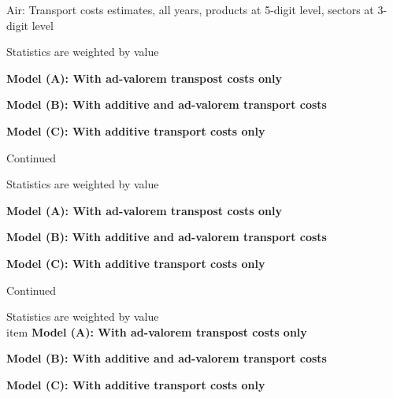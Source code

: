 \documentclass[11pt,twoside, authoryear]{elsarticle}
\begin{document}
\begin{landscape}
\begin{table}[htbp]
	
	\caption{Air: Transport costs estimates, all years, products at 5-digit level, sectors at 3-digit level}
	\begin{center}
		
		
				\begin{tablenotes}
			\tiny
			\item Statistics are weighted by value
			\item \textbf{Model (A): With ad-valorem transpost costs only}
			\item \textbf{Model (B): With additive and ad-valorem transport costs}
			\item \textbf{Model (C): With additive transport costs only}
		\end{tablenotes}
		
	\end{center}
	\label{tab_oa:result_ves_ally3}%
\end{table}%


\begin{table}[htbp]
	
	\caption{Continued}
	\begin{center}
		
		
				\begin{tablenotes}
			\tiny
			\item Statistics are weighted by value
			\item \textbf{Model (A): With ad-valorem transpost costs only}
			\item \textbf{Model (B): With additive and ad-valorem transport costs}
			\item \textbf{Model (C): With additive transport costs only}
		\end{tablenotes}
		
	\end{center}
	\label{tab_oa:result_ves_ally3}%
\end{table}%

\begin{table}[htbp]

\caption{Continued}
\begin{center}
	
	
			\begin{tablenotes}
		\tiny
		\item Statistics are weighted by value
		\\item \textbf{Model (A): With ad-valorem transpost costs only}
		\item \textbf{Model (B): With additive and ad-valorem transport costs}
		\item \textbf{Model (C): With additive transport costs only}
	\end{tablenotes}
	

\end{center}
\end{table}
\end{landscape}
\end{document}
